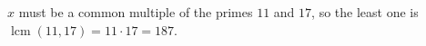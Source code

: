$x$ must be a common multiple of the primes $11$ and $17$, so the least one is $\operatorname{lcm}(11,17)=11\cdot17=\boxed{187}$.
